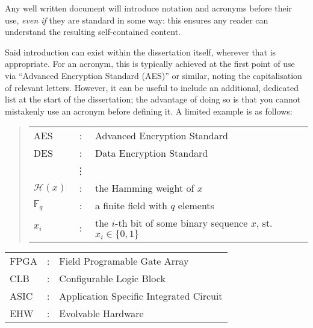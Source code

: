 \noindent
{
\color{red}
Any well written document will introduce notation and acronyms before
their use, {\em even if} they are standard in some way: this ensures 
any reader can understand the resulting self-contained content.  

Said introduction can exist within the dissertation itself, wherever 
that is appropriate.  For an acronym, this is typically achieved at 
the first point of use via ``Advanced Encryption Standard (AES)'' or 
similar, noting the capitalisation of relevant letters.  However, it 
can be useful to include an additional, dedicated list at the start 
of the dissertation; the advantage of doing so is that you cannot 
mistakenly use an acronym before defining it.  A limited example is 
as follows:

\begin{quote}
\noindent
\begin{tabular}{lcl}
AES                 &:     & Advanced Encryption Standard                                         \\
DES                 &:     & Data Encryption Standard                                             \\
                    &\vdots&                                                                      \\
${\mathcal H}( x )$ &:     & the Hamming weight of $x$                                            \\
${\mathbb  F}_q$    &:     & a finite field with $q$ elements                                     \\
$x_i$               &:     & the $i$-th bit of some binary sequence $x$, st. $x_i \in \{ 0, 1 \}$ \\
\end{tabular}
\end{quote}
}

\begin{tabular}{lcl}
FPGA &: & Field Programable Gate Array\\
CLB &: & Configurable Logic Block \\
ASIC &: & Application Specific Integrated Circuit\\
EHW &: & Evolvable Hardware
\end{tabular}
